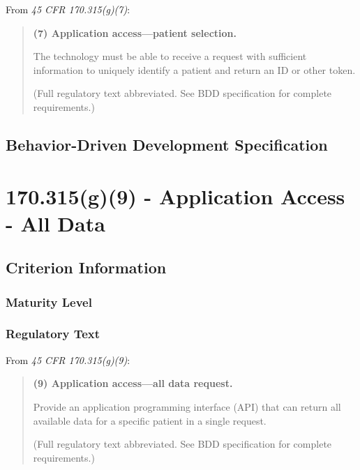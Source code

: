 From \textit{45 CFR \textsection{} 170.315(g)(7)}:

\begin{quotation}
\textbf{(7) Application access---patient selection.}

The technology must be able to receive a request with sufficient information to uniquely identify a patient and return an ID or other token.

(Full regulatory text abbreviated. See BDD specification for complete requirements.)
\end{quotation}

\section{Behavior-Driven Development Specification}




\chapter{\textsection{} 170.315(g)(9) - Application Access - All Data}
\label{chap:g9}


\section{Criterion Information}

\subsection{Maturity Level}

\subsection{Regulatory Text}

From \textit{45 CFR \textsection{} 170.315(g)(9)}:

\begin{quotation}
\textbf{(9) Application access---all data request.}

Provide an application programming interface (API) that can return all available data for a specific patient in a single request.

(Full regulatory text abbreviated. See BDD specification for complete requirements.)
\end{quotation}

